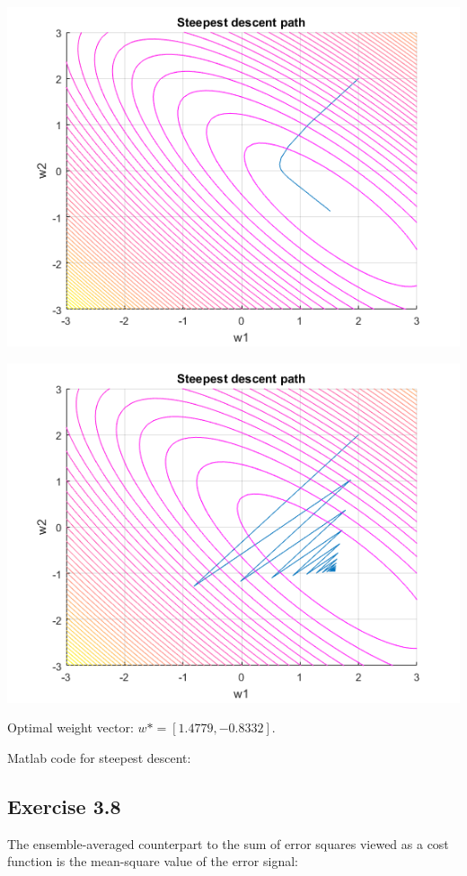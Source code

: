 \documentclass[a4paper, 12pt]{article}
\begin{document}
\includegraphics[scale = 1]{d1.png}

\includegraphics[scale = 1]{d2.png}

\smallskip

Optimal weight vector: $w* = [ 1.4779,-0.8332]$.


\newpage

Matlab code for steepest descent:
\medskip


\subsection{Exercise 3.8}
The ensemble-averaged counterpart to the sum of error squares viewed as a cost function is the mean-square value
of the error signal:
\end{document}
